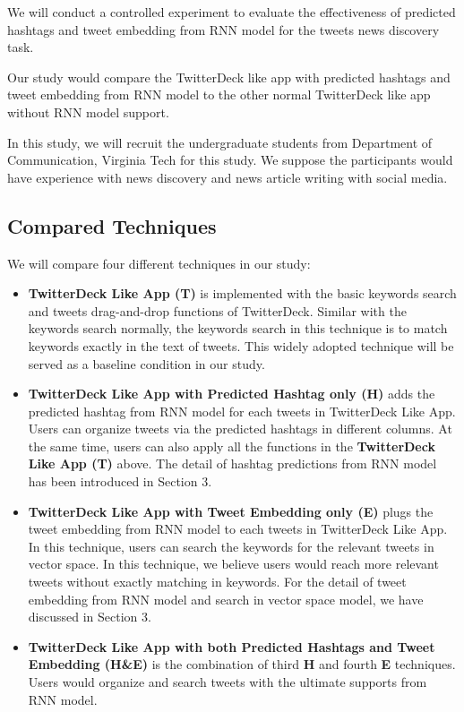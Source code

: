 We will conduct a controlled experiment to evaluate the effectiveness of predicted hashtags and tweet embedding from RNN model for the tweets news discovery task.    

Our study would compare the TwitterDeck like app with predicted hashtags and tweet embedding from RNN model to the other normal TwitterDeck like app without RNN model support.  

In this study, we will recruit the undergraduate students from Department of Communication, Virginia Tech for this study. We suppose the participants would have experience with news discovery and news article writing with social media.

\subsection{Compared Techniques}

We will compare four different techniques in our study:

\begin{itemize}
  \item \textbf{TwitterDeck Like App (T)} is implemented with the basic keywords search and tweets drag-and-drop functions of TwitterDeck. Similar with the keywords search normally, the keywords search in this technique is to match keywords exactly in the text of tweets. This widely adopted technique will be served as a baseline condition in our study. 
  
  \item \textbf{TwitterDeck Like App with Predicted Hashtag only (H)} adds the predicted hashtag from RNN model for each tweets in TwitterDeck Like App. Users can organize tweets via the predicted hashtags in different columns. At the same time, users can also apply all the functions in the \textbf{TwitterDeck Like App (T)} above. The detail of hashtag predictions from RNN model has been introduced in Section 3. 

  \item \textbf{TwitterDeck Like App with Tweet Embedding only (E)} plugs the tweet embedding from RNN model to each tweets in TwitterDeck Like App. In this technique, users can search the keywords for the relevant tweets in vector space. In this technique, we believe users would reach more relevant tweets without exactly matching in keywords. For the detail of tweet embedding from RNN model and search in vector space model, we have discussed in Section 3.   
  
  \item \textbf{TwitterDeck Like App with both Predicted Hashtags and Tweet Embedding (H\&E)} is the combination of third \textbf{H} and fourth \textbf{E} techniques. Users would organize and search tweets with the ultimate supports from RNN model. 
  
\end{itemize}

